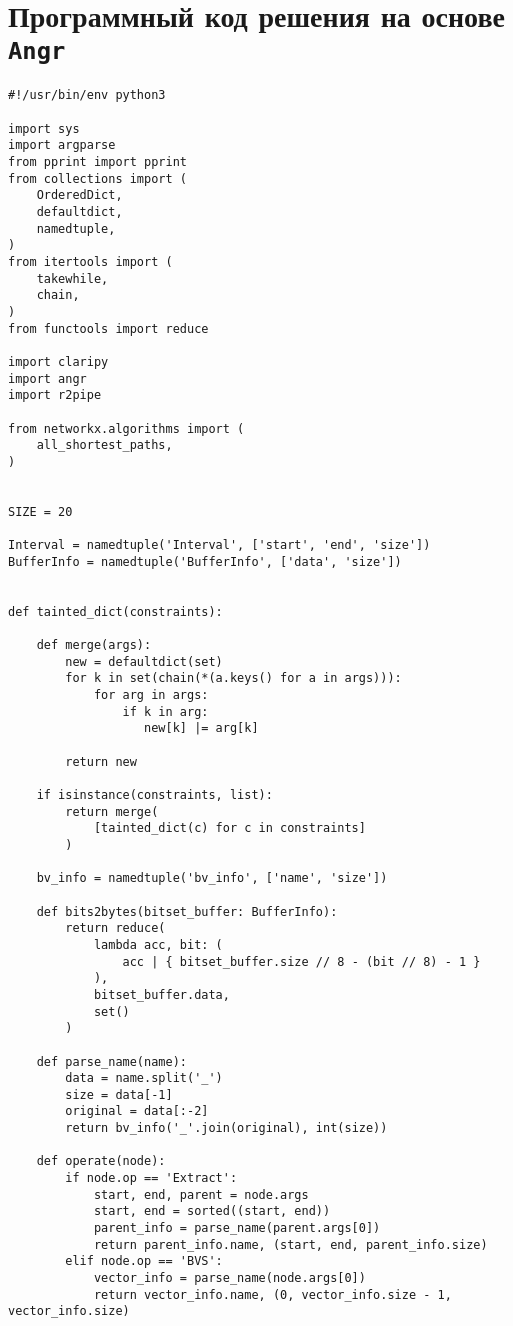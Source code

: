 \appendix
\chapter{Программный код решения на основе \texttt{Angr}}
\label{angrimpl}

\begin{lstlisting}[environoment=py_code, caption=taint\_influence.py, captionpos=b]
#!/usr/bin/env python3

import sys
import argparse
from pprint import pprint
from collections import (
    OrderedDict,
    defaultdict,
    namedtuple,
)
from itertools import (
    takewhile,
    chain,
)
from functools import reduce

import claripy
import angr
import r2pipe

from networkx.algorithms import (
    all_shortest_paths,
)


SIZE = 20

Interval = namedtuple('Interval', ['start', 'end', 'size'])
BufferInfo = namedtuple('BufferInfo', ['data', 'size'])


def tainted_dict(constraints):

    def merge(args):
        new = defaultdict(set)
        for k in set(chain(*(a.keys() for a in args))):
            for arg in args:
                if k in arg:
                   new[k] |= arg[k]

        return new

    if isinstance(constraints, list):
        return merge(
            [tainted_dict(c) for c in constraints]
        )

    bv_info = namedtuple('bv_info', ['name', 'size'])

    def bits2bytes(bitset_buffer: BufferInfo):
        return reduce(
            lambda acc, bit: (
                acc | { bitset_buffer.size // 8 - (bit // 8) - 1 }
            ),
            bitset_buffer.data,
            set()
        )

    def parse_name(name):
        data = name.split('_')
        size = data[-1]
        original = data[:-2]
        return bv_info('_'.join(original), int(size))

    def operate(node):
        if node.op == 'Extract':
            start, end, parent = node.args
            start, end = sorted((start, end))
            parent_info = parse_name(parent.args[0])
            return parent_info.name, (start, end, parent_info.size)
        elif node.op == 'BVS':
            vector_info = parse_name(node.args[0])
            return vector_info.name, (0, vector_info.size - 1, vector_info.size)


\end{lstlisting}
